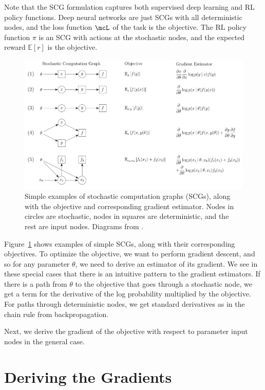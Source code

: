 \documentclass[12pt]{report}
\begin{document}
Note that the SCG formulation captures both supervised deep learning and RL policy functions. Deep neural networks are just SCGs with all deterministic nodes, and the loss function $\mcL$ of the task is the objective. The RL policy function $\pi$ is an SCG with actions at the stochastic nodes, and the expected reward $\mathbb{E}[r]$ is the objective.

\begin{figure}[t]
\includegraphics[width=\textwidth]{images/SCGs}
\caption[Stochastic Computation Graphs]{Simple examples of stochastic computation graphs (SCGs), along with the objective and corresponding gradient estimator. Nodes in circles are stochastic, nodes in squares are deterministic, and the rest are input nodes. Diagrams from \citet{schulman2015backprop}.}
\label{fig:scg}
\end{figure}

Figure~\ref{fig:scg} shows examples of simple SCGs, along with their corresponding objectives. To optimize the objective, we want to perform gradient descent, and so for any parameter $\theta$, we need to derive an estimator of its gradient.
We see in these special cases that there is an intuitive pattern to the gradient estimators. If there is a path from $\theta$ to the objective that goes through a stochastic node, we get a term for the derivative of the log probability multiplied by the objective. For paths through deterministic nodes, we get standard derivatives as in the chain rule from backpropagation.

Next, we derive the gradient of the objective with respect to parameter input nodes in the general case.

\section{Deriving the Gradients}
\end{document}
